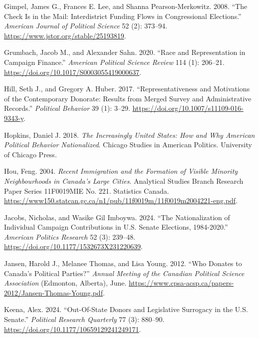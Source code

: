 \documentclass[
  letterpaper,
  DIV=11,
  numbers=noendperiod]{scrartcl}
\newlength{\cslhangindent}
\newenvironment{CSLReferences}[2] %
 {\begin{list}{}{%
  \setlength{\itemindent}{0pt}
  \setlength{\leftmargin}{0pt}
  \setlength{\parsep}{0pt}
  \ifodd #1
   \setlength{\leftmargin}{\cslhangindent}
   \setlength{\itemindent}{-1\cslhangindent}
  \fi
  \setlength{\itemsep}{#2\baselineskip}}}
 {\end{list}}
\begin{document}
\begin{CSLReferences}{1}{1}
Gimpel, James G., Frances E. Lee, and Shanna Pearson-Merkowitz. 2008.
{``The {Check} {Is} in the {Mail}: {Interdistrict} {Funding} {Flows} in
{Congressional} {Elections}.''} \emph{American Journal of Political
Science} 52 (2): 373--94. \url{https://www.jstor.org/stable/25193819}.

Grumbach, Jacob M., and Alexander Sahn. 2020. {``Race and Representation
in Campaign Finance.''} \emph{American Political Science Review} 114
(1): 206--21. \url{https://doi.org/10.1017/S0003055419000637}.

Hill, Seth J., and Gregory A. Huber. 2017. {``Representativeness and
Motivations of the Contemporary Donorate: Results from Merged Survey and
Administrative Records.''} \emph{Political Behavior} 39 (1): 3--29.
\url{https://doi.org/10.1007/s11109-016-9343-y}.

Hopkins, Daniel J. 2018. \emph{The Increasingly United States: How and
Why American Political Behavior Nationalized}. Chicago Studies in
American Politics. University of Chicago Press.

Hou, Feng. 2004. \emph{Recent {Immigration} and the {Formation} of
{Visible} {Minority} {Neighbourhoods} in {Canada}'s {Large} {Cities}}.
Analytical Studies Branch Research Paper Series 11F0019MIE No. 221.
Statistics Canada.
\url{https://www150.statcan.gc.ca/n1/pub/11f0019m/11f0019m2004221-eng.pdf}.

Jacobs, Nicholas, and Wasike Gil Imboywa. 2024. {``The {Nationalization}
of {Individual} {Campaign} {Contributions} in {U}.{S}. {Senate}
{Elections}, 1984-2020.''} \emph{American Politics Research} 52 (3):
239--48. \url{https://doi.org/10.1177/1532673X231220639}.

Jansen, Harold J., Melanee Thomas, and Lisa Young. 2012. {``Who Donates
to Canada's Political Parties?''} \emph{Annual Meeting of the Canadian
Political Science Association} (Edmonton, Alberta), June.
\url{https://www.cpsa-acsp.ca/papers-2012/Jansen-Thomas-Young.pdf}.

Keena, Alex. 2024. {``Out-{Of}-{State} {Donors} and {Legislative}
{Surrogacy} in the {U}.{S}. {Senate}.''} \emph{Political Research
Quarterly} 77 (3): 880--90.
\url{https://doi.org/10.1177/10659129241249171}.


\end{CSLReferences}
\end{document}
